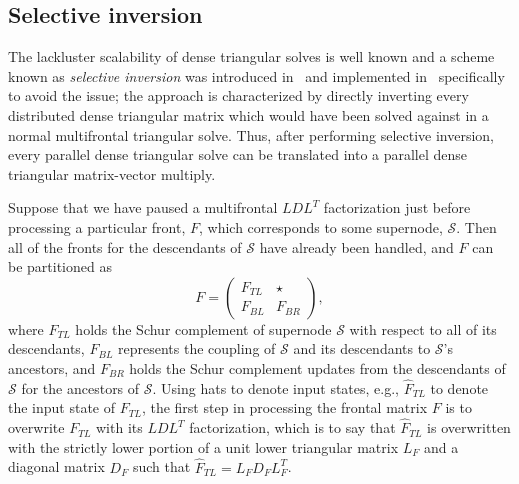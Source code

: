 \subsection{Selective inversion}
\label{subsection:selective-inversion}
The lackluster scalability of dense triangular solves is well known and
a scheme known as {\em selective inversion} was introduced 
in~\cite{Raghavan-invert} and implemented in~\cite{Raghavan-dscpack} 
specifically to avoid the issue; the approach is 
characterized by directly inverting every distributed dense triangular matrix 
which would have been solved against in a normal multifrontal triangular solve. Thus, after performing selective inversion, every parallel dense triangular 
solve can be translated into a parallel dense triangular matrix-vector multiply.

Suppose that we have paused a multifrontal $LDL^T$ factorization just before
processing a particular front, $F$, which corresponds to some supernode, 
$\mathcal{S}$. Then all of the fronts for the descendants of $\mathcal{S}$ 
have already been handled, and $F$ can be partitioned as
\begin{equation}
  F = \left(\begin{array}{cc} F_{TL} & \star \\ 
                              F_{BL} & F_{BR}\end{array}\right),
\end{equation}
where $F_{TL}$ holds the Schur complement of supernode $\mathcal{S}$ with 
respect to all of its descendants, $F_{BL}$ 
represents the coupling of $\mathcal{S}$ and its descendants to $\mathcal{S}$'s
ancestors, and $F_{BR}$ holds the Schur complement updates from 
the descendants of $\mathcal{S}$ for the ancestors of $\mathcal{S}$. Using 
hats to denote input states, e.g., $\hat F_{TL}$ to denote the input state
of $F_{TL}$, the first step in processing the frontal matrix $F$ is to 
overwrite $F_{TL}$ with its $LDL^T$ factorization, which is to say that 
$\hat F_{TL}$ is overwritten with the strictly lower portion of a unit lower 
triangular matrix $L_F$ and a diagonal matrix $D_F$ such that 
$\hat F_{TL} = L_F D_F L_F^T$. 

